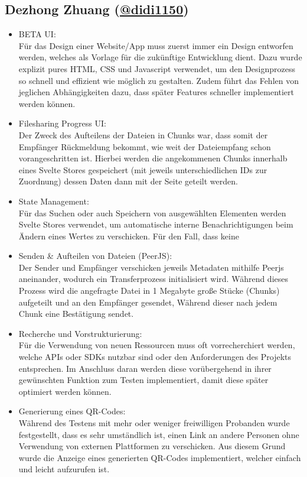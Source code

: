 \documentclass[a4paper]{article}
\begin{document}
\subsection{Dezhong Zhuang (\href{https://github.com/didi1150}{@didi1150})}
\begin{itemize}
      \item BETA UI:\\
            Für das Design einer Website/App muss zuerst immer ein Design
            entworfen werden, welches als Vorlage für die zukünftige Entwicklung
            dient. Dazu wurde explizit pures HTML, CSS und Javascript verwendet,
            um den Designprozess so schnell und effizient wie möglich zu
            gestalten. Zudem führt das Fehlen von jeglichen Abhängigkeiten dazu,
            dass später Features schneller implementiert werden können.
      \item Filesharing Progress UI:\\
            Der Zweck des Aufteilens der Dateien in Chunks war, dass somit der
            Empfänger Rückmeldung bekommt, wie weit der Dateiempfang schon
            vorangeschritten ist. Hierbei werden die angekommenen Chunks
            innerhalb eines Svelte Stores gespeichert (mit jeweils
            unterschiedlichen IDs zur Zuordnung) dessen Daten dann mit der Seite
            geteilt werden.
      \item State Management:\\
            Für das Suchen oder auch Speichern von ausgewählten Elementen werden
            Svelte Stores verwendet, um automatische interne Benachrichtigungen
            beim Ändern eines Wertes zu verschicken. Für den Fall, dass keine
      \item Senden \& Aufteilen von Dateien (PeerJS):\\
            Der Sender und Empfänger verschicken jeweils Metadaten mithilfe
            Peerjs aneinander, wodurch ein Transferprozess initialisiert wird.
            Während dieses Prozess wird die angefragte Datei in 1 Megabyte große
            Stücke (Chunks) aufgeteilt und an den Empfänger gesendet, Während
            dieser nach jedem Chunk eine Bestätigung sendet.
      \item Recherche und Vorstrukturierung:\\
            Für die Verwendung von neuen Ressourcen muss oft vorrecherchiert
            werden, welche APIs oder SDKs nutzbar sind oder den Anforderungen
            des Projekts entsprechen. Im Anschluss daran werden diese
            vorübergehend in ihrer gewünschten Funktion zum Testen
            implementiert, damit diese später optimiert werden können.
      \item Generierung eines QR-Codes:\\
            Während des Testens mit mehr oder weniger freiwilligen Probanden
            wurde festgestellt, dass es sehr umständlich ist, einen Link an
            andere Personen ohne Verwendung von externen Plattformen zu
            verschicken. Aus diesem Grund wurde die Anzeige eines generierten
            QR-Codes implementiert, welcher einfach und leicht aufzurufen ist.
\end{itemize}
\end{document}
